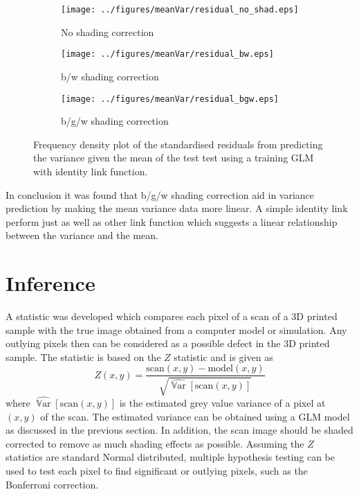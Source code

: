 \documentclass[a4paper]{proc}
\DeclareMathOperator{\variance}{\mathbb{V}ar}
\begin{document}
\begin{figure*}
	\centering
	\begin{subfigure}{0.45\textwidth}
		\centering
		\texttt{[image: ../figures/meanVar/residual\_no\_shad.eps]}
		\caption{No shading correction}
	\end{subfigure}
	\begin{subfigure}{0.45\textwidth}
		\centering
		\texttt{[image: ../figures/meanVar/residual\_bw.eps]}
		\caption{b/w shading correction}
	\end{subfigure}
	\begin{subfigure}{0.45\textwidth}
		\centering
		\texttt{[image: ../figures/meanVar/residual\_bgw.eps]}
		\caption{b/g/w shading correction}
	\end{subfigure}
	\caption{Frequency density plot of the standardised residuals from predicting the variance given the mean of the test test using a training GLM with identity link function.}
	\label{fig:glm_residual}
\end{figure*}

In conclusion it was found that b/g/w shading correction aid in variance prediction by making the mean variance data more linear. A simple identity link perform just as well as other link function which suggests a linear relationship between the variance and the mean.

\section{Inference}

A statistic was developed which compares each pixel of a scan of a 3D printed sample with the true image obtained from a computer model or simulation. Any outlying pixels then can be considered as a possible defect in the 3D printed sample. The statistic is based on the $Z$ statistic and is given as
\begin{equation}
Z(x,y) = \frac{\text{scan}(x,y) - \text{model}(x,y)}{\sqrt{\widehat{\variance}[\text{scan}(x,y)]}}
\end{equation}
where $\widehat{\variance}[\text{scan}(x,y)]$ is the estimated grey value variance of a pixel at $(x,y)$ of the scan. The estimated variance can be obtained using a GLM model as discussed in the previous section. In addition, the scan image should be shaded corrected to remove as much shading effects as possible. Assuming the $Z$ statistics are standard Normal distributed, multiple hypothesis testing can be used to test each pixel to find significant or outlying pixels, such as the Bonferroni correction.
\end{document}
